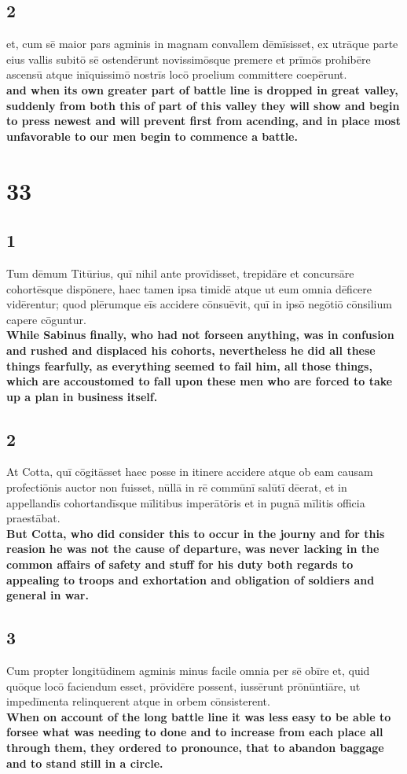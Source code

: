 \documentclass{article}
\begin{document}
\subsection*{2}
et, cum sē maior pars agminis in magnam convallem dēmīsisset, ex utrāque parte eius vallis subitō sē ostendērunt novissimōsque premere et prīmōs prohibēre ascensū atque inīquissimō nostrīs locō proelium committere coepērunt.\\
\textbf{and when its own greater part of battle line is dropped in great valley, suddenly from both this of part of this valley they will show and begin to press newest and will prevent first from acending, and in place most unfavorable to our men begin to commence a battle.  }

\section*{33}

\subsection*{1}
Tum dēmum Titūrius, quī nihil ante provīdisset, trepidāre et concursāre cohortēsque dispōnere, haec tamen ipsa timidē atque ut eum omnia dēficere vidērentur; quod plērumque eīs accidere cōnsuēvit, quī in ipsō negōtiō cōnsilium capere cōguntur. \\
\textbf{While Sabinus finally, who had not forseen anything, was in confusion and rushed and displaced his cohorts, nevertheless he did all these things fearfully, as everything seemed to fail him, all those things, which are accoustomed to fall upon these men who are forced to take up a plan in business itself.}

\subsection*{2}
At Cotta, quī cōgitāsset haec posse in itinere accidere atque ob eam causam profectiōnis auctor non fuisset, nūllā in rē commūnī salūtī dēerat, et in appellandīs cohortandīsque mīlitibus imperātōris et in pugnā mīlitis officia praestābat. \\
\textbf{But Cotta, who did consider this to occur in the journy and for this reasion he was not the cause of departure, was never lacking in the common affairs of safety and stuff for his duty both regards to appealing to troops and exhortation and obligation of soldiers and general in war.}

\subsection*{3}
Cum propter longitūdinem agminis minus facile omnia per sē obīre et, quid quōque locō faciendum esset, prōvidēre possent, iussērunt prōnūntiāre, ut impedīmenta relinquerent atque in orbem cōnsisterent. \\
\textbf{When on account of the long battle line it was less easy to be able to forsee what was needing to done and to increase from each place all through them, they ordered to pronounce, that to abandon baggage and to stand still in a circle.}
\end{document}
